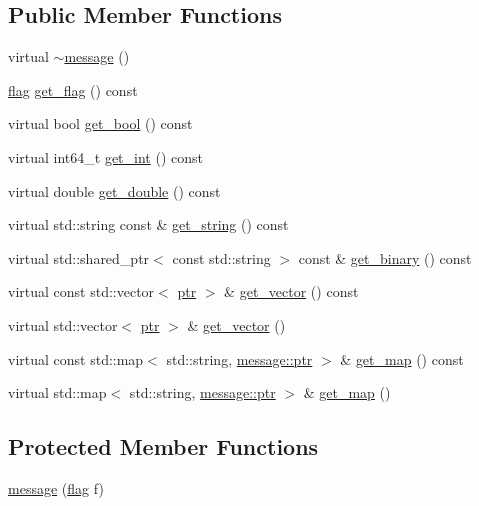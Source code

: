 \subsection*{Public Member Functions}
\begin{DoxyCompactItemize}
\item 
virtual \hyperlink{classsio_1_1message_a0fe3f725f2cd8b207b43a9dbe24fe1c5}{$\sim$message} ()
\item 
\hyperlink{classsio_1_1message_a5274f78a8f77cd535d4acf476badf769}{flag} \hyperlink{classsio_1_1message_a2c8eb600ca29b420a5a1d826f0f6d5e6}{get\+\_\+flag} () const
\item 
virtual bool \hyperlink{classsio_1_1message_a3acbec589c3dc214d44dd4db1a6f8a2c}{get\+\_\+bool} () const
\item 
virtual int64\+\_\+t \hyperlink{classsio_1_1message_ae77c363200284d6741f0ac92f0e13ed2}{get\+\_\+int} () const
\item 
virtual double \hyperlink{classsio_1_1message_aa89963cd233b29653df1ce1943f9ea57}{get\+\_\+double} () const
\item 
virtual std\+::string const  \& \hyperlink{classsio_1_1message_a8e923d7e688e1bc69b586ef33684dd7a}{get\+\_\+string} () const
\item 
virtual std\+::shared\+\_\+ptr$<$ const std\+::string $>$ const  \& \hyperlink{classsio_1_1message_a55b9eeeb305f46bbf21ae339501174c2}{get\+\_\+binary} () const
\item 
virtual const std\+::vector$<$ \hyperlink{classsio_1_1message_a6340b6fef57e4516eb17928b1885a615}{ptr} $>$ \& \hyperlink{classsio_1_1message_af310192e16427f655dc89c627aae4fe7}{get\+\_\+vector} () const
\item 
virtual std\+::vector$<$ \hyperlink{classsio_1_1message_a6340b6fef57e4516eb17928b1885a615}{ptr} $>$ \& \hyperlink{classsio_1_1message_af62004da998c98ee7039a26d809c44d3}{get\+\_\+vector} ()
\item 
virtual const std\+::map$<$ std\+::string, \hyperlink{classsio_1_1message_a6340b6fef57e4516eb17928b1885a615}{message\+::ptr} $>$ \& \hyperlink{classsio_1_1message_a954a981a468fcea36ff19cce6ae7fd5e}{get\+\_\+map} () const
\item 
virtual std\+::map$<$ std\+::string, \hyperlink{classsio_1_1message_a6340b6fef57e4516eb17928b1885a615}{message\+::ptr} $>$ \& \hyperlink{classsio_1_1message_a6ca4aee4616aa9dfde4de317d5efd125}{get\+\_\+map} ()
\end{DoxyCompactItemize}
\subsection*{Protected Member Functions}
\begin{DoxyCompactItemize}
\item 
\hyperlink{classsio_1_1message_a592180d0792737b4bb73f5e5c30e386e}{message} (\hyperlink{classsio_1_1message_a5274f78a8f77cd535d4acf476badf769}{flag} f)
\end{DoxyCompactItemize}


